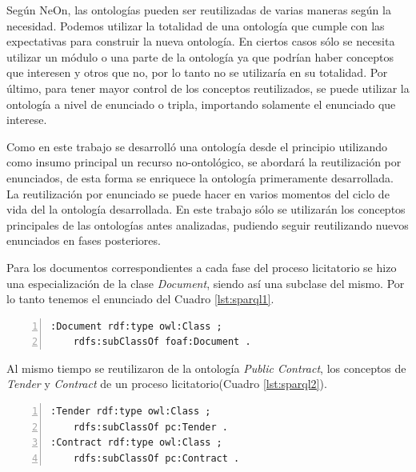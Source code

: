     Según NeOn, las ontologías pueden ser reutilizadas de varias maneras según la necesidad. 
Podemos utilizar la totalidad de una ontología que cumple con las expectativas para construir la nueva ontología. En ciertos casos sólo se necesita utilizar un módulo o una parte de la ontología ya que podrían haber conceptos que interesen y otros que no, por lo tanto no se utilizaría en su totalidad. Por último, para tener mayor control de los conceptos reutilizados, se puede utilizar la ontología a nivel de enunciado o tripla, importando solamente el enunciado que interese. 

Como en este trabajo se desarrolló una ontología desde el principio utilizando como insumo principal un recurso no-ontológico, se abordará la reutilización por enunciados, de esta forma se enriquece la ontología primeramente desarrollada. La reutilización por enunciado se puede hacer en varios momentos del ciclo de vida del la ontología desarrollada. En este trabajo sólo se utilizarán los conceptos principales de las ontologías antes analizadas, pudiendo seguir reutilizando nuevos enunciados en fases posteriores.

Para los documentos correspondientes a cada fase del proceso licitatorio se hizo una especialización de la clase \textit{Document}, siendo así una subclase del mismo. Por lo tanto tenemos el enunciado del Cuadro \ref{lst:sparql1}.\hfill \break


\noindent\begin{minipage}{\textwidth}

\begin{lstlisting}[captionpos=b, caption={Reutilización de la Clase Document}, label={lst:sparql1},  numbers=left,  numberstyle=\tiny\color{mygray},frame=single]
:Document rdf:type owl:Class ;
    rdfs:subClassOf foaf:Document .
\end{lstlisting}
\end{minipage}

 Al mismo tiempo se reutilizaron de la ontología \textit{Public Contract}, los conceptos de \textit{Tender} y \textit{Contract} de un proceso licitatorio(Cuadro \ref{lst:sparql2}).\hfill \break

\noindent\begin{minipage}{\textwidth}
 \begin{lstlisting}[captionpos=b, caption={Conceptos de Tender y Contract}, label={lst:sparql2},  numbers=left,  numberstyle=\tiny\color{mygray},frame=single]
:Tender rdf:type owl:Class ;
    rdfs:subClassOf pc:Tender .
:Contract rdf:type owl:Class ;
    rdfs:subClassOf pc:Contract .
\end{lstlisting}
\end{minipage}

